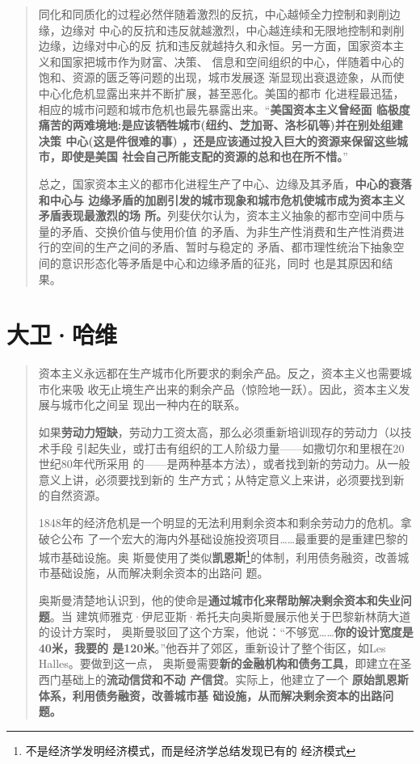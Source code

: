 \begin{quotation}
  同化和同质化的过程必然伴随着激烈的反抗，中心越倾全力控制和剥削边缘，边缘对
  中心的反抗和违反就越激烈，中心越连续和无限地控制和剥削边缘，边缘对中心的反
  抗和违反就越持久和永恒。另一方面，国家资本主义和国家把城市作为财富、决策、
  信息和空间组织的中心，伴随着中心的饱和、资源的匮乏等问题的出现，城市发展逐
  渐显现出衰退迹象，从而使中心化危机显露出来并不断扩展，甚至恶化。美国的都市
  化进程最迅猛，相应的城市问题和城市危机也最先暴露出来。“\textbf{美国资本主义曾经面
  临极度痛苦的两难境地:是应该牺牲城市(纽约、芝加哥、洛杉矶等)并在别处组建决策
  中心(这是件很难的事) ，还是应该通过投入巨大的资源来保留这些城市，即使是美国
  社会自己所能支配的资源的总和也在所不惜。}”

  总之，国家资本主义的都市化进程生产了中心、边缘及其矛盾，\textbf{中心的衰落和中心与
  边缘矛盾的加剧引发的城市现象和城市危机使城市成为资本主义矛盾表现最激烈的场
  所。}列斐伏尔认为，资本主义抽象的都市空间中质与量的矛盾、交换价值与使用价值
  的矛盾、为非生产性消费和生产性消费进行的空间的生产之间的矛盾、暂时与稳定的
  矛盾、都市理性统治下抽象空间的意识形态化等矛盾是中心和边缘矛盾的征兆，同时
  也是其原因和结果。
\end{quotation}

\section{大卫·哈维}

\begin{quotation}

  资本主义永远都在生产城市化所要求的剩余产品。反之，资本主义也需要城市化来吸
  收无止境生产出来的剩余产品（惊险地一跃）。因此，资本主义发展与城市化之间呈
  现出一种内在的联系。


  如果\textbf{劳动力短缺}，劳动力工资太高，那么必须重新培训现存的劳动力（以技术手段
  引起失业，或打击有组织的工人阶级力量——如撒切尔和里根在20世纪80年代所采用
  的——是两种基本方法），或者找到新的劳动力。从一般意义上讲，必须要找到新的
  生产方式；从特定意义上来讲，必须要找到新的自然资源。


  1848年的经济危机是一个明显的无法利用剩余资本和剩余劳动力的危机。拿破仑公布
  了一个宏大的海内外基础设施投资项目……最重要的是重建巴黎的城市基础设施。奥
  斯曼使用了类似\textbf{凯恩斯}\footnote{不是经济学发明经济模式，而是经济学总结发现已有的
    经济模式}的体制，利用债务融资，改善城市基础设施，从而解决剩余资本的出路问
  题。

  奥斯曼清楚地认识到，他的使命是\textbf{通过城市化来帮助解决剩余资本和失业问题}。当
  建筑师雅克·伊尼亚斯·希托夫向奥斯曼展示他关于巴黎新林荫大道的设计方案时，
  奥斯曼驳回了这个方案，他说：“不够宽……\textbf{你的设计宽度是40米，我要的
    是120米}。”他吞并了郊区，重新设计了整个街区，如Les Halles。要做到这一点，
  奥斯曼需要\textbf{新的金融机构和债务工具}，即建立在圣西门基础上的\textbf{流动信贷和不动
    产信贷}。实际上，他建立了一个 \textbf{原始凯恩斯体系，利用债务融资，改善城市基
    础设施，从而解决剩余资本的出路问题。}
\end{quotation}



